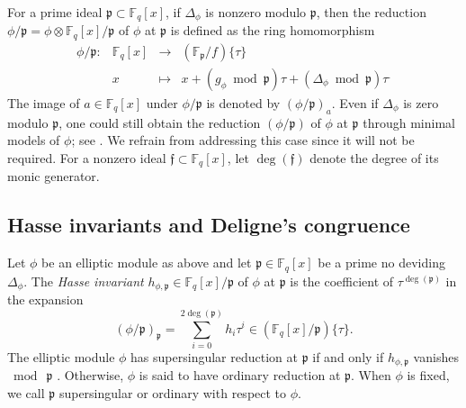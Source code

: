 \documentclass[12pt]{article}
\theoremstyle{plain}
\theoremstyle{definition}
\newcommand{\ang}[1]{\{#1\}}
\def\F{\ensuremath{\mathbb{F}}}
\newcommand{\ph}{(\phi/\p)}
\newcommand{\p}{\mathfrak p}
\newcommand{\f}{\mathfrak f}
\begin{document}
For a prime ideal $\p \subset \F_q[x]$, if $\Delta_\phi$ is nonzero modulo $\p$, then the reduction 
$\phi / \p = \phi \otimes \F_q[x] / \p$ of $\phi$ at $\p$ is defined as the ring homomorphism
\[
\begin{array}{rrll}
	\phi / \p : & \F_q[x] & \longrightarrow & (\F_\p/f) \ang{\tau} \\
	& x & \longmapsto & x + (g_\phi \bmod \p) \tau + (\Delta_\phi \bmod \p) \tau^.
\end{array}
\]
The image of $a \in \F_q[x]$ under $\phi/\p$ is denoted by $(\phi/\p)_a$. Even if $\Delta_{\phi}$ 
is zero modulo $\p$, one could still obtain the reduction $(\phi/\p)$ of $\phi$ at $\p$ through
minimal models of $\phi$; see \cite{gek1}. We refrain from addressing this case since it will not 
be required. For a nonzero ideal $\f \subset \F_q[x]$, let $\deg(\f)$ denote the degree of its 
monic generator.


\subsection{Hasse invariants and Deligne's congruence}

Let $\phi$ be an elliptic module as above and let $\p \in \F_q[x]$ be a prime no deviding  
$\Delta_\phi$. The \textit{Hasse invariant} $h_{\phi,\p} \in \F_q[x]/\p$ of $\phi$ at $\p$ is the 
coefficient of $\tau^{\deg(\p)}$ in the expansion 
\[ \ph_\p = \sum_{i=0}^{2\deg(\p)} h_i \tau^i \in (\F_{q}[x]/\p)\{\tau\}. \]
The elliptic module $\phi$ has supersingular reduction at $\p$ if and only if $h_{\phi, \p}$ 
vanishes $\bmod ~\p$ \cite{gos}. Otherwise, $\phi$ is said to have ordinary reduction at $\p$. When 
$\phi$ is fixed, we call $\p$ supersingular or ordinary with respect to $\phi$.
\end{document}
